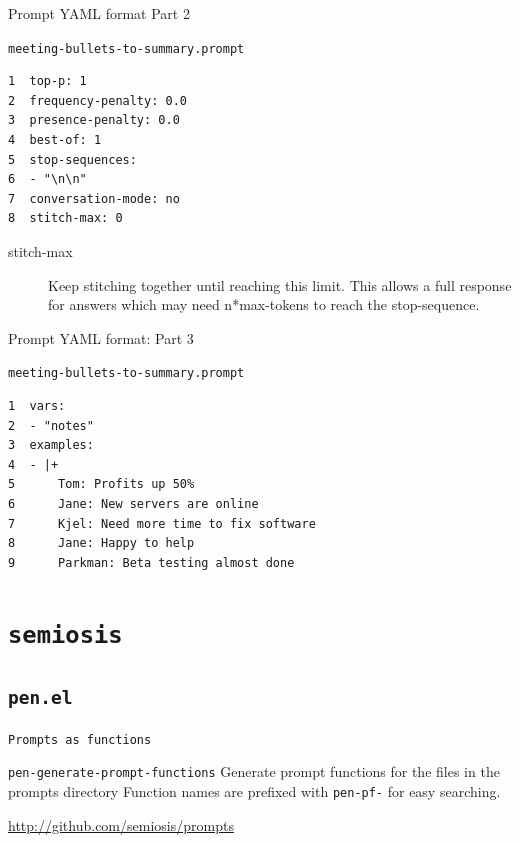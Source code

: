 \documentclass[presentation]{beamer}
\begin{document}
\begin{frame}[label={sec:org2e99b7d},fragile]{Prompt YAML format Part 2}
 \begin{block}{\texttt{meeting-bullets-to-summary.prompt}}
\begin{verbatim}
1  top-p: 1
2  frequency-penalty: 0.0
3  presence-penalty: 0.0
4  best-of: 1
5  stop-sequences:
6  - "\n\n"
7  conversation-mode: no
8  stitch-max: 0
\end{verbatim}

\begin{description}
\item[{stitch-max}] Keep stitching together until reaching this limit.
This allows a full response for answers which may need n*max-tokens to reach the stop-sequence.
\end{description}
\end{block}
\end{frame}

\begin{frame}[label={sec:org50d9a1b},fragile]{Prompt YAML format: Part 3}
 \begin{block}{\texttt{meeting-bullets-to-summary.prompt}}
\begin{verbatim}
1  vars:
2  - "notes"
3  examples:
4  - |+
5      Tom: Profits up 50%
6      Jane: New servers are online
7      Kjel: Need more time to fix software
8      Jane: Happy to help
9      Parkman: Beta testing almost done
\end{verbatim}
\end{block}
\end{frame}

\section{\texttt{semiosis}}
\label{sec:orge670c96}
\subsection{\texttt{pen.el}}
\label{sec:orgf7e67c3}
\begin{frame}[label={sec:orgafc9334},fragile]{\texttt{Prompts as functions}}
 \begin{block}{\texttt{pen-generate-prompt-functions}}
Generate prompt functions for the files in the
prompts directory Function names are prefixed
with \texttt{pen-pf-} for easy searching.

\url{http://github.com/semiosis/prompts}
\end{block}
\end{frame}
\end{document}
